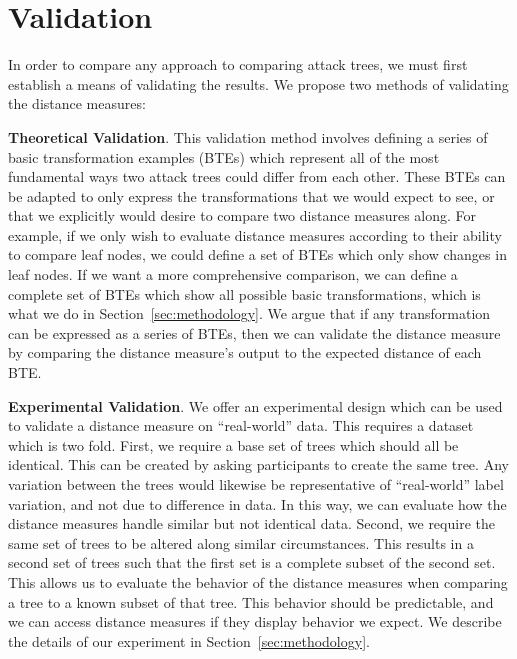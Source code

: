 \section{Validation}
\label{sec:validation}

In order to compare any approach to comparing attack trees, we must first establish a means of validating the results. We propose two methods of validating the distance measures:

\textbf{Theoretical Validation}. This validation method involves defining a series of basic transformation examples (BTEs) which represent all of the most fundamental ways two attack trees could differ from each other. These BTEs can be adapted to only express the transformations that we would expect to see, or that we explicitly would desire to compare two distance measures along. For example, if we only wish to evaluate distance measures according to their ability to compare leaf nodes, we could define a set of BTEs which only show changes in leaf nodes. If we want a more comprehensive comparison, we can define a complete set of BTEs which show all possible basic transformations, which is what we do in Section~\ref{sec:methodology}. We argue that if any transformation can be expressed as a series of BTEs, then we can validate the distance measure by comparing the distance measure's output to the expected distance of each BTE.

\textbf{Experimental Validation}. We offer an experimental design which can be used to validate a distance measure on ``real-world'' data. This requires a dataset which is two fold. First, we require a base set of trees which should all be identical. This can be created by asking participants to create the same tree. Any variation between the trees would likewise be representative of ``real-world'' label variation, and not due to difference in data. In this way, we can evaluate how the distance measures handle similar but not identical data. Second, we require the same set of trees to be altered along similar circumstances. This results in a second set of trees such that the first set is a complete subset of the second set. This allows us to evaluate the behavior of the distance measures when comparing a tree to a known subset of that tree. This behavior should be predictable, and we can access distance measures if they display behavior we expect. We describe the details of our experiment in Section~\ref{sec:methodology}.